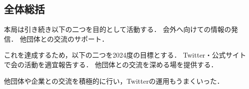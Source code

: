 \subsection*{全体総括}


本局は引き続き以下の二つを目的として活動する．
    会外へ向けての情報の発信．
    他団体との交流のサポート．
 
これを達成するため，以下の二つを2024度の目標とする．
    Twitter・公式サイトで会の活動を適宜報告する．
    他団体との交流を深める場を提供する．

他団体や企業との交流を積極的に行い，Twitterの運用もうまくいった．